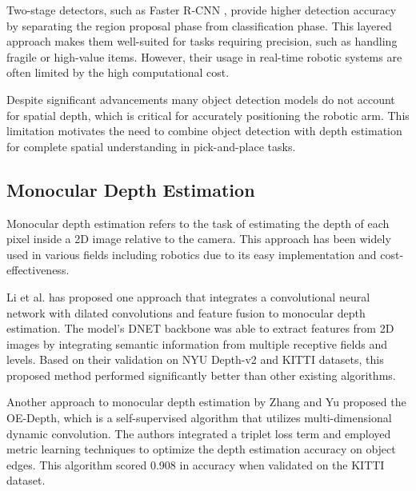 \vspace{10pt}

Two-stage detectors, such as Faster R-CNN \cite{ren2016fasterr-cnn}, provide higher detection accuracy by separating the region proposal phase from classification phase. This layered approach makes them well-suited for tasks requiring precision, such as handling fragile or high-value items. However, their usage in real-time robotic systems are often limited by the high computational cost.

\vspace{10pt}

Despite significant advancements many object detection models do not account for spatial depth, which is critical for accurately positioning the robotic arm. This limitation motivates the need to combine object detection with depth estimation for complete spatial understanding in pick-and-place tasks.

\subsection{Monocular Depth Estimation}
Monocular depth estimation refers to the task of estimating the depth of each pixel inside a 2D image relative to the camera. This approach has been widely used in various fields including robotics due to its easy implementation and cost-effectiveness.

\vspace{10pt}

Li et al. \cite{huiyi_li_2024} has proposed one approach that integrates a convolutional neural network with dilated convolutions and feature fusion to monocular depth estimation. The model’s DNET backbone was able to extract features from 2D images by integrating semantic information from multiple receptive fields and levels. Based on their validation on NYU Depth-v2 and KITTI datasets, this proposed method performed significantly better than other existing algorithms.

\vspace{10pt}

Another approach to monocular depth estimation by Zhang and Yu \cite{rui_zhang_2024} proposed the OE-Depth, which is a self-supervised algorithm that utilizes multi-dimensional dynamic convolution. The authors integrated a triplet loss term and employed metric learning techniques to optimize the depth estimation accuracy on object edges. This algorithm scored 0.908 in accuracy when validated on the KITTI dataset.

